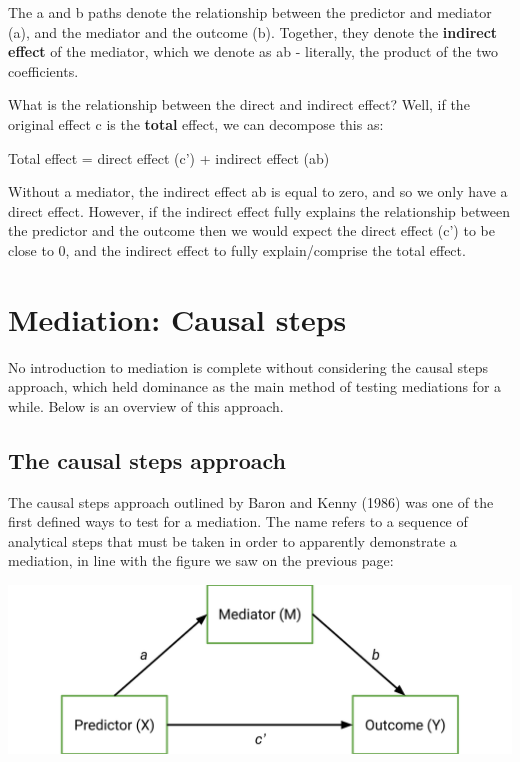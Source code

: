 \documentclass[
]{book}
\begin{document}
The a and b paths denote the relationship between the predictor and mediator (a), and the mediator and the outcome (b). Together, they denote the \textbf{indirect effect} of the mediator, which we denote as ab - literally, the product of the two coefficients.

What is the relationship between the direct and indirect effect? Well, if the original effect c is the \textbf{total} effect, we can decompose this as:

Total effect = direct effect (c') + indirect effect (ab)

Without a mediator, the indirect effect ab is equal to zero, and so we only have a direct effect. However, if the indirect effect fully explains the relationship between the predictor and the outcome then we would expect the direct effect (c') to be close to 0, and the indirect effect to fully explain/comprise the total effect.

\section{Mediation: Causal steps}\label{mediation-causal-steps}

No introduction to mediation is complete without considering the causal steps approach, which held dominance as the main method of testing mediations for a while. Below is an overview of this approach.

\subsection{The causal steps approach}\label{the-causal-steps-approach}

The causal steps approach outlined by Baron and Kenny (1986) was one of the first defined ways to test for a mediation. The name refers to a sequence of analytical steps that must be taken in order to apparently demonstrate a mediation, in line with the figure we saw on the previous page:

\begin{center}\includegraphics{img/mediation_2} \end{center}
\end{document}
